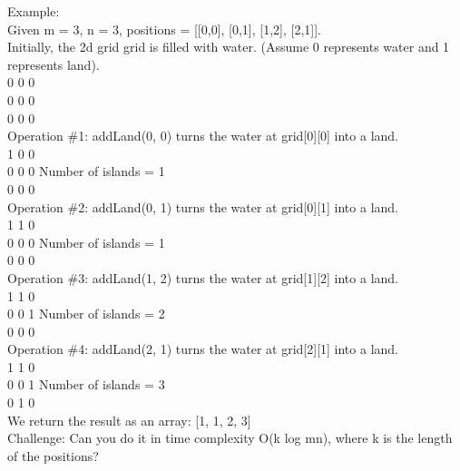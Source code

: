 Example:\\
Given m = 3, n = 3, positions = [[0,0], [0,1], [1,2], [2,1]].\\

Initially, the 2d grid grid is filled with water. (Assume 0 represents water and 1 represents land).\\
0 0 0\\
0 0 0\\
0 0 0\\

Operation \#1: addLand(0, 0) turns the water at grid[0][0] into a land.\\
1 0 0\\
0 0 0   Number of islands = 1\\
0 0 0\\

Operation \#2: addLand(0, 1) turns the water at grid[0][1] into a land.\\
1 1 0\\
0 0 0   Number of islands = 1\\
0 0 0\\

Operation \#3: addLand(1, 2) turns the water at grid[1][2] into a land.\\
1 1 0\\
0 0 1   Number of islands = 2\\
0 0 0\\

Operation \#4: addLand(2, 1) turns the water at grid[2][1] into a land.\\
1 1 0\\
0 0 1   Number of islands = 3\\
0 1 0\\

We return the result as an array: [1, 1, 2, 3]\\

Challenge: Can you do it in time complexity O(k log mn), where k is the length of the positions?\\

